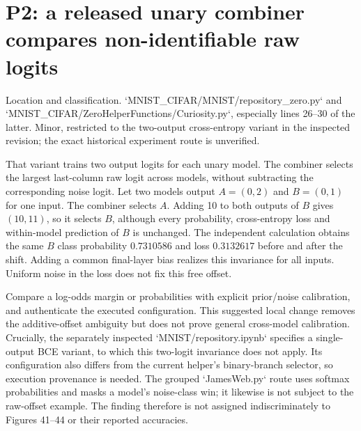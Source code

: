 \documentclass[10pt]{article}
\begin{document}
\section*{P2: a released unary combiner compares non-identifiable raw logits}
Location and classification. `MNIST\_CIFAR/MNIST/repository\_zero.py` and `MNIST\_CIFAR/ZeroHelperFunctions/Curiosity.py`, especially lines 26–30 of the latter. Minor, restricted to the two-output cross-entropy variant in the inspected revision; the exact historical experiment route is unverified.\par
That variant trains two output logits for each unary model. The combiner selects the largest last-column raw logit across models, without subtracting the corresponding noise logit. Let two models output \(A=(0,2)\) and \(B=(0,1)\) for one input. The combiner selects \(A\). Adding 10 to both outputs of \(B\) gives \((10,11)\), so it selects \(B\), although every probability, cross-entropy loss and within-model prediction of \(B\) is unchanged. The independent calculation obtains the same \(B\) class probability \(0.7310586\) and loss \(0.3132617\) before and after the shift. Adding a common final-layer bias realizes this invariance for all inputs. Uniform noise in the loss does not fix this free offset.\par
Compare a log-odds margin or probabilities with explicit prior/noise calibration, and authenticate the executed configuration. This suggested local change removes the additive-offset ambiguity but does not prove general cross-model calibration. Crucially, the separately inspected `MNIST/repository.ipynb` specifies a single-output BCE variant, to which this two-logit invariance does not apply. Its configuration also differs from the current helper’s binary-branch selector, so execution provenance is needed. The grouped `JamesWeb.py` route uses softmax probabilities and masks a model’s noise-class win; it likewise is not subject to the raw-offset example. The finding therefore is not assigned indiscriminately to Figures 41–44 or their reported accuracies.\par
\end{document}

